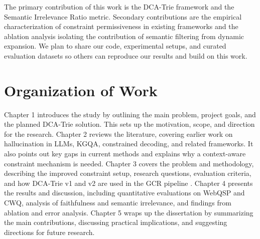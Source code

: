 The primary contribution of this work is the DCA-Trie framework and the Semantic Irrelevance Ratio metric. Secondary contributions are the empirical characterization of constraint permissiveness in existing frameworks and the ablation analysis isolating the contribution of semantic filtering from dynamic expansion. We plan to share our code, experimental setups, and curated evaluation datasets so others can reproduce our results and build on this work.

\section{Organization of Work}

Chapter 1 introduces the study by outlining the main problem, project goals, and the planned DCA-Trie solution. This sets up the motivation, scope, and direction for the research. Chapter 2 reviews the literature, covering earlier work on hallucination in LLMs, KGQA, constrained decoding, and related frameworks. It also points out key gaps in current methods and explains why a context-aware constraint mechanism is needed. Chapter 3 covers the problem and methodology, describing the improved constraint setup, research questions, evaluation criteria, and how DCA-Trie v1 and v2 are used in the GCR pipeline \citep{luo2025-graph-constrained-reasoning}. Chapter 4 presents the results and discussion, including quantitative evaluations on WebQSP and CWQ, analysis of faithfulness and semantic irrelevance, and findings from ablation and error analysis. Chapter 5 wraps up the dissertation by summarizing the main contributions, discussing practical implications, and suggesting directions for future research.
